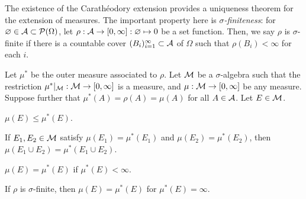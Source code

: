 \documentclass{../../large}
\begin{document}
\begin{prb}
The existence of the Carath\'eodory extension provides a uniqueness theorem for the extension of measures.
The important property here is \emph{$\sigma$-finiteness}: for $\varnothing\in\mathcal{A}\subset\mathcal{P}(\Omega)$, let $\rho:\mathcal{A}\to[0,\infty]:\varnothing\mapsto0$ be a set function.
Then, we say $\rho$ is $\sigma$-finite if there is a countable cover $(B_i)_{i=1}^\infty\subset\mathcal{A}$ of $\Omega$ such that $\rho(B_i)<\infty$ for each $i$.

Let $\mu^*$ be the outer measure associated to $\rho$.
Let $\mathcal{M}$ be a $\sigma$-algebra such that the restriction $\mu^*|_{\mathcal{M}}:\mathcal{M}\to[0,\infty]$ is a measure, and $\mu:\mathcal{M}\to[0,\infty]$ be any measure.
Suppose further that $\mu^*(A)=\rho(A)=\mu(A)$ for all $A\in\mathcal{A}$.
Let $E\in\mathcal{M}$.
\begin{parts}
\item $\mu(E)\le\mu^*(E)$.
\item If $E_1,E_2\in\mathcal{M}$ satisfy $\mu(E_1)=\mu^*(E_1)$ and $\mu(E_2)=\mu^*(E_2)$, then $\mu(E_1\cup E_2)=\mu^*(E_1\cup E_2)$.
\item $\mu(E)=\mu^*(E)$ if $\mu^*(E)<\infty$.
\item If $\rho$ is $\sigma$-finite, then $\mu(E)=\mu^*(E)$ for $\mu^*(E)=\infty$.
\end{parts}
\end{prb}
\end{document}
